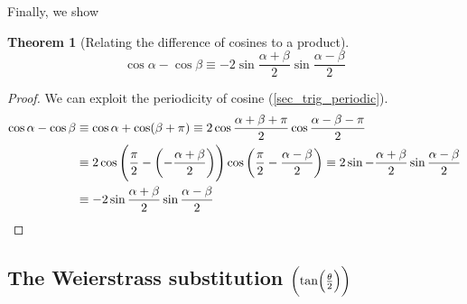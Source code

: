 \documentclass[fleqn,a4paper,11pt]{article}
\newtheorem{theorem}{Theorem}[section]
\begin{document}
    Finally, we show
    \begin{theorem}[Relating the difference of cosines to a product]
    \begin{equation*}
    \cos \alpha - \cos \beta \equiv
     -2 \sin \frac{\alpha + \beta} 2 \sin \frac{\alpha - \beta} 2
    \end{equation*}
    \end{theorem}
    \begin{proof}
    We can exploit the periodicity of cosine (\ref{sec_trig_periodic}).
    \begin{align*}
     \cos \alpha - \cos \beta &\equiv
     \cos \alpha + \cos (\beta + \pi)  \equiv
     2 \cos \frac{\alpha + \beta + \pi} 2 \cos \frac {\alpha - \beta - \pi} 2
     \\&\equiv
     2 \cos \pqty{\frac \pi 2 - \pqty{-\frac{\alpha + \beta} 2}}
       \cos \pqty{\frac \pi 2 - \frac{\alpha - \beta} 2} \equiv
     2 \sin -\frac{\alpha + \beta} 2 \sin \frac{\alpha - \beta} 2 \\&\equiv
     -2 \sin \frac{\alpha + \beta} 2 \sin \frac{\alpha - \beta} 2 \qedhere
    \end{align*}
    \end{proof}

    \subsection[The Weierstrass substitution (\(\tan(\theta / 2)\))]
       {The Weierstrass substitution \boldmath\(\pqty{\tan(\frac \theta 2)}\)}
\end{document}
